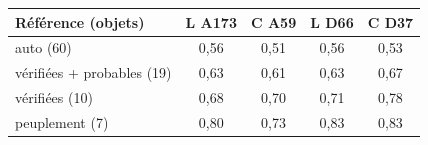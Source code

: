 \begin{tabular}{lcccc}
\toprule
Référence (objets) & L A173 & C A59 & L D66 & C D37 \\
\midrule
auto (60) & 0{,}56 & 0{,}51 & 0{,}56 & 0{,}53 \\
vérifiées + probables (19) & 0{,}63 & 0{,}61 & 0{,}63 & 0{,}67 \\
vérifiées (10) & 0{,}68 & 0{,}70 & 0{,}71 & 0{,}78 \\
peuplement (7) & 0{,}80 & 0{,}73 & 0{,}83 & 0{,}83 \\
\bottomrule
\end{tabular}
